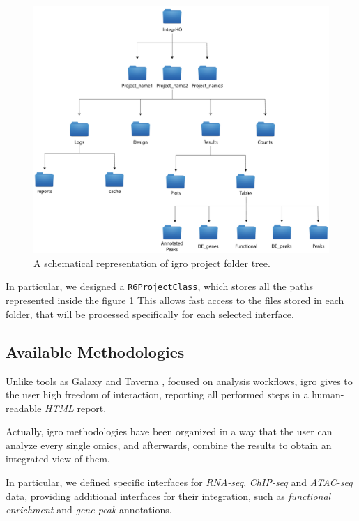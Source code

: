 \begin{figure}[H]
\centering
\includegraphics[width=\textwidth, keepaspectratio]{img/integrho/project_folder.pdf}
\caption[\gls{igro} folder tree]{A schematical representation of \gls{igro} project folder tree.}
\label{fig:integrhotree}
\end{figure}

In particular, we designed a \lstinline!R6ProjectClass!, which stores all the paths represented inside the figure \ref{fig:integrhotree}
This allows fast access to the files stored in each folder, that will be processed specifically for each selected interface.


\subsection{Available Methodologies}

Unlike tools as Galaxy \cite{Hillman-Jackson2012} and Taverna \cite{Wolstencroft2013}, focused on analysis workflows, \gls{igro} gives to the user high freedom of interaction, reporting all performed steps in a human-readable \textit{HTML} report.
 
Actually, \gls{igro} methodologies have been organized in a way that the user can analyze every single omics, and afterwards, combine the results to obtain an integrated view of them.

In particular, we defined specific interfaces for \textit{RNA-seq}, \textit{ChIP-seq} and \textit{ATAC-seq} data, providing additional interfaces for their integration, such as \textit{functional enrichment} and \textit{gene-peak} annotations.

